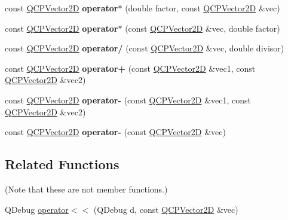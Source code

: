 \begin{DoxyCompactItemize}
const \hyperlink{class_q_c_p_vector2_d}{Q\+C\+P\+Vector2D} {\bfseries operator$\ast$} (double factor, const \hyperlink{class_q_c_p_vector2_d}{Q\+C\+P\+Vector2D} \&vec)
\item 
\mbox{\label{class_q_c_p_vector2_d_aace10d28a76e84e7380ede1a9cb58274}} 
const \hyperlink{class_q_c_p_vector2_d}{Q\+C\+P\+Vector2D} {\bfseries operator$\ast$} (const \hyperlink{class_q_c_p_vector2_d}{Q\+C\+P\+Vector2D} \&vec, double factor)
\item 
\mbox{\label{class_q_c_p_vector2_d_aa69909afc8c656999a2ea292ea01244b}} 
const \hyperlink{class_q_c_p_vector2_d}{Q\+C\+P\+Vector2D} {\bfseries operator/} (const \hyperlink{class_q_c_p_vector2_d}{Q\+C\+P\+Vector2D} \&vec, double divisor)
\item 
\mbox{\label{class_q_c_p_vector2_d_a24cc5985429b12dbed4d0d3c5a917d20}} 
const \hyperlink{class_q_c_p_vector2_d}{Q\+C\+P\+Vector2D} {\bfseries operator+} (const \hyperlink{class_q_c_p_vector2_d}{Q\+C\+P\+Vector2D} \&vec1, const \hyperlink{class_q_c_p_vector2_d}{Q\+C\+P\+Vector2D} \&vec2)
\item 
\mbox{\label{class_q_c_p_vector2_d_a9e01331d8debf0877ee4cba9abd83605}} 
const \hyperlink{class_q_c_p_vector2_d}{Q\+C\+P\+Vector2D} {\bfseries operator-\/} (const \hyperlink{class_q_c_p_vector2_d}{Q\+C\+P\+Vector2D} \&vec1, const \hyperlink{class_q_c_p_vector2_d}{Q\+C\+P\+Vector2D} \&vec2)
\item 
\mbox{\label{class_q_c_p_vector2_d_a14c807d345ee3f22d6809bb5a4137b52}} 
const \hyperlink{class_q_c_p_vector2_d}{Q\+C\+P\+Vector2D} {\bfseries operator-\/} (const \hyperlink{class_q_c_p_vector2_d}{Q\+C\+P\+Vector2D} \&vec)
\end{DoxyCompactItemize}
\subsection*{Related Functions}
(Note that these are not member functions.) \begin{DoxyCompactItemize}
\item 
Q\+Debug \hyperlink{class_q_c_p_vector2_d_a6c757af9671d925af4a36c2f58fb7234}{operator$<$$<$} (Q\+Debug d, const \hyperlink{class_q_c_p_vector2_d}{Q\+C\+P\+Vector2D} \&vec)
\end{DoxyCompactItemize}


